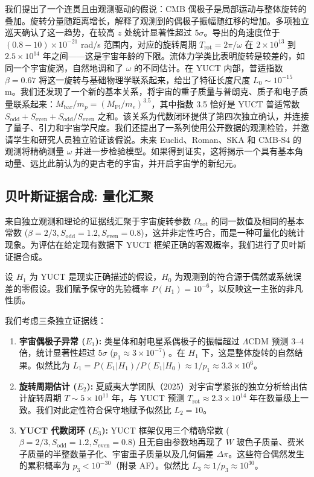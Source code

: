\documentclass[11pt,a4paper]{article}
\begin{document}
	我们提出了一个连贯且由观测驱动的假说：CMB 偶极子是局部运动与整体旋转的叠加。旋转分量随距离增长，解释了观测到的偶极子振幅随红移的增加。多项独立巡天确认了这一趋势，在较高 \(z\) 处统计显著性超过 \(5\sigma\)。导出的角速度位于 \((0.8-10)\times10^{-21}\) rad/s 范围内，对应的旋转周期 \(T_{\text{rot}} = 2\pi/\omega\) 在 \(2\times10^{13}\) 到 \(2.5\times10^{14}\) 年之间——这是宇宙年龄的下限。流体力学类比表明旋转是较差的，如同一个宇宙旋涡，自然地调和了 \(\omega\) 的不同估计。在 YUCT 内部，普适指数 \(\beta = 0.67\) 将这一旋转与基础物理学联系起来，给出了特征长度尺度 \(L_0 \sim 10^{-15}\) m。我们还发现了一个新的基本关系，将宇宙的重子质量与普朗克、质子和电子质量联系起来：\(M_{\mathrm{bar}}/m_p = (M_{\mathrm{Pl}}/m_e)^{3.5}\)，其中指数 3.5 恰好是 YUCT 普适常数 \(S_{\mathrm{odd}} + S_{\mathrm{even}} + S_{\mathrm{odd}}/S_{\mathrm{even}}\) 之和。该关系为代数闭环提供了第四次独立确认，并连接了量子、引力和宇宙学尺度。我们还提出了一系列使用公开数据的观测检验，并邀请学生和研究人员独立验证该假说。未来 Euclid、Roman、SKA 和 CMB‑S4 的观测将精确测量 \(\omega\) 并进一步检验模型。如果得到证实，这将揭示一个具有基本角动量、远比此前认为的更古老的宇宙，并开启宇宙学的新纪元。
	
	\subsection{贝叶斯证据合成: 量化汇聚}
	
	来自独立观测和理论的证据线汇聚于宇宙旋转参数 \(\Omega_{\mathrm{rot}}\) 的同一数值及相同的基本常数 (\(\beta=2/3, S_{\mathrm{odd}}=1.2, S_{\mathrm{even}}=0.8\))，这并非定性巧合，而是一种可量化的统计现象。为评估在给定现有数据下 YUCT 框架正确的客观概率，我们进行了贝叶斯证据合成。
	
	设 \(H_1\) 为 YUCT 是现实正确描述的假设，\(H_0\) 为观测到的符合源于偶然或系统误差的零假设。我们赋予保守的先验概率 \(P(H_1) = 10^{-6}\)，以反映这一主张的非凡性质。
	
	我们考虑三条独立证据线：
	\begin{enumerate}
		\item \textbf{宇宙偶极子异常 (\(E_1\)):} 类星体和射电星系偶极子的振幅超过 \(\Lambda\)CDM 预测 3–4 倍，统计显著性超过 \(5\sigma\) (\(p_1 \approx 3 \times 10^{-7}\)) \cite{Secrest2025, Singal2024}。在 \(H_1\) 下，这是整体旋转的自然结果。似然比为 \(L_1 = P(E_1|H_1)/P(E_1|H_0) \approx 1/p_1 \approx 3.3 \times 10^6\)。
		
		\item \textbf{旋转周期估计 (\(E_2\)):} 夏威夷大学团队（2025）对宇宙学紧张的独立分析给出估计旋转周期 \(T \sim 5 \times 10^{11}\) 年，与 YUCT 预测 \(T_{\mathrm{rot}} \approx 2.3 \times 10^{14}\) 年在数量级上一致。我们对此定性符合保守地赋予似然比 \(L_2 = 10\)。
		
		\item \textbf{YUCT 代数闭环 (\(E_3\)):} YUCT 框架仅用三个精确常数 (\(\beta=2/3, S_{\mathrm{odd}}=1.2, S_{\mathrm{even}}=0.8\)) 且无自由参数地再现了 \(W\) 玻色子质量、费米子质量的半整数量子化、宇宙重子质量以及几何偏差 \(\Delta\pi\)。这些符合偶然发生的累积概率为 \(p_3 < 10^{-30}\)（附录 AF）。似然比 \(L_3 \approx 1/p_3 \approx 10^{30}\)。
	\end{enumerate}
	
\end{document}
